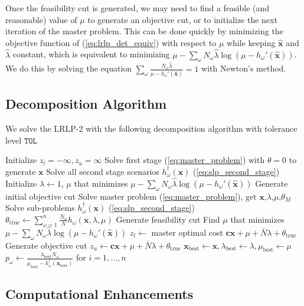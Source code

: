 \documentclass[11pt]{article}
\newcommand{\x}{\mathbf{x}}
\newcommand{\xh}{\hat{\x}}
\newcommand{\lh}{\hat{\lambda}}
\renewcommand{\c}{\mathbf{c}}
\begin{document}
Once the feasibility cut is generated, we may need to find a feasible (and reasonable) value of $\mu$ to generate an objective cut, or to initialize the next iteration of the master problem.
This can be done quickly by minimizing the objective function of (\ref{eq:lrlp_det_equiv}) with respect to $\mu$ while keeping $\xh$ and $\lh$ constant, which is equivalent to minimizing $\mu - \sum_\omega N_\omega \lh \log(\mu - h_\omega'(\xh))$.
We do this by solving the equation $\sum_\omega \frac{N_\omega \lh}{\mu - h_\omega'(\xh)} = 1$ with Newton's method.

\subsection{Decomposition Algorithm}

We solve the LRLP-2 with the following decomposition algorithm with tolerance level $\texttt{TOL}$

\begin{algorithmic}
	\State Initialize $z_l = -\infty, z_u = \infty$
	\State Solve first stage (\ref{eq:master_problem}) with $\theta = 0$  to generate $\x$
	\State Solve all second stage scenarios $h^\dagger_\omega(\x)$ (\ref{eq:slp_second_stage})
	\State Initialize $\lambda \gets 1$, $\mu$ that minimizes $\mu - \sum_\omega N_\omega \lh \log(\mu - h_\omega'(\xh))$
	\State Generate initial objective cut
		\State Solve master problem (\ref{eq:master_problem}), get $\x$,$\lambda$,$\mu$,$\theta_M$
		\State Solve sub-problems $h^\dagger_\omega(\x)$ (\ref{eq:slp_second_stage})
		\State $\theta_{\text{true}} \gets \sum_{\omega=1}^n \frac{N_\omega}{N} h_\omega(\x,\lambda,\mu)$
		\If{$\mu < \max_\omega h_\omega'(\x)$}
			\State Generate feasibility cut
			\State Find $\mu$ that minimizes $\mu - \sum_\omega N_\omega \lh \log(\mu - h_\omega'(\xh))$
		\Else
			\State $z_l \gets$ master optimal cost $\c\x + \mu + \bar{N}\lambda + \theta_{\text{true}}$
		\EndIf
		\State Generate objective cut
		\If{$\c\x + \mu + \bar{N}\lambda + \theta_{\text{true}} < z_u$}
			\State $z_u \gets \c\x + \mu + \bar{N}\lambda + \theta_{\text{true}}$
			\State $\x_\text{best} \gets \x, \lambda_\text{best} \gets \lambda, \mu_\text{best} \gets \mu$
			\State $p_\omega \gets \frac{\lambda_\text{best} N_\omega}{\mu_\text{best} - h^\dagger_\omega(\x_\text{best})}$ for $i = 1, \dots, n$
		\EndIf
	\EndWhile
\end{algorithmic}

\subsection{Computational Enhancements}
\end{document}
